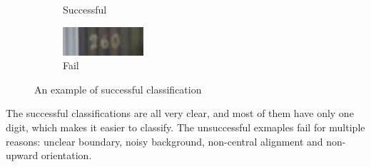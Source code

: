 \begin{figure}[htbp]
\begin{subfigure}[t]{0.4\textwidth}
		\caption{Successful}\label{fig:16d}
	\end{subfigure}
	\qquad
	\begin{subfigure}[t]{0.4\textwidth}
	    \centering
		\includegraphics{hw4/problem2/24.png}
		\caption{Fail}\label{fig:16e}
	\end{subfigure}
	\caption{An example of successful classification}\label{fig:16}
\end{figure}
The successful classifications are all very clear, and most of them have only one digit, which makes it easier to classify.
The unsuccessful exmaples fail for multiple reasons: unclear boundary, noisy background, non-central alignment and non-upward orientation.


